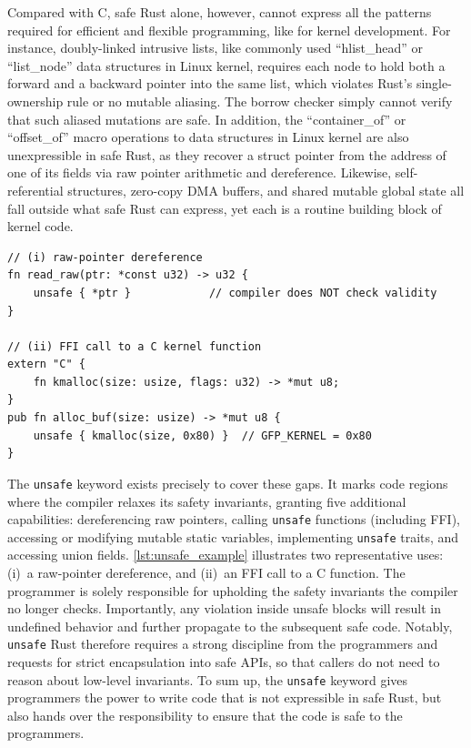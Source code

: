 Compared with C, safe Rust alone, however, cannot express all the patterns required for efficient and flexible programming, like for kernel development. For instance, doubly-linked intrusive lists, like commonly used ``hlist\_head'' or ``list\_node'' data structures in Linux kernel, requires each node to hold both a forward and a backward pointer into the same list, which violates Rust's single-ownership rule or no mutable aliasing. The borrow checker simply cannot verify that such aliased mutations are safe.
In addition, the ``container\_of'' or ``offset\_of'' macro operations to data structures in Linux kernel are also unexpressible in safe Rust, as they recover a struct pointer from the address of one of its fields via raw pointer arithmetic and dereference. Likewise, self-referential structures, zero-copy DMA buffers, and shared mutable global state all fall outside what safe Rust can express, yet each is a routine building block of kernel code.


\begin{listing}
\begin{lstlisting}[columns=fullflexible]
// (i) raw-pointer dereference
fn read_raw(ptr: *const u32) -> u32 {
    unsafe { *ptr }            // compiler does NOT check validity
}

// (ii) FFI call to a C kernel function
extern "C" {
    fn kmalloc(size: usize, flags: u32) -> *mut u8;
}
pub fn alloc_buf(size: usize) -> *mut u8 {
    unsafe { kmalloc(size, 0x80) }  // GFP_KERNEL = 0x80
}
\end{lstlisting}
\label{lst:unsafe_example}
\end{listing}


The \texttt{unsafe} keyword exists precisely to cover these gaps. It marks code regions where the compiler relaxes its safety invariants, granting five additional capabilities: dereferencing raw pointers, calling \texttt{unsafe} functions (including FFI), accessing or modifying mutable static variables, implementing \texttt{unsafe} traits, and accessing union fields. \autoref{lst:unsafe_example} illustrates two representative uses: (i)~a
raw-pointer dereference, and (ii)~an FFI call to a C function.
The programmer is solely responsible for upholding the safety invariants the
compiler no longer checks. Importantly, any violation inside unsafe blocks will result in undefined behavior and further propagate to the subsequent safe code.
Notably, \texttt{unsafe} Rust therefore requires a strong discipline from the programmers and requests for strict encapsulation into safe APIs, so that callers do not need to reason about low-level invariants. To sum up, the \texttt{unsafe} keyword gives programmers the power to write code that is not expressible in safe Rust, but also hands over the responsibility to ensure that the code is safe to the programmers.




